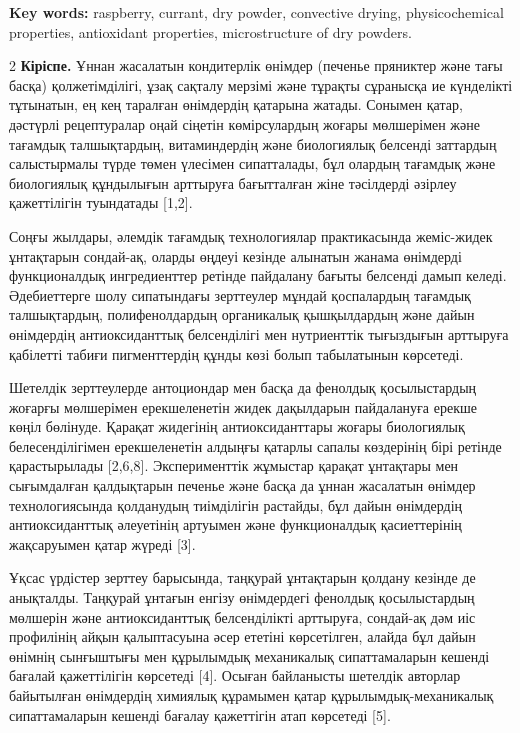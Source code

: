 {\bfseries Key words:} raspberry, currant, dry powder, convective drying,
physicochemical properties, antioxidant properties, microstructure of
dry powders.

\begin{multicols}{2}
{\bfseries Кіріспе.} Ұннан жасалатын кондитерлік өнімдер (печенье пряниктер
және тағы басқа) қолжетімділігі, ұзақ сақталу мерзімі және тұрақты
сұранысқа ие күнделікті тұтынатын, ең кең таралған өнімдердің қатарына
жатады. Сонымен қатар, дәстүрлі рецептуралар оңай сіңетін көмірсулардың
жоғары мөлшерімен және тағамдық талшықтардың, витаминдердің және
биологиялық белсенді заттардың салыстырмалы түрде төмен үлесімен
сипатталады, бұл олардың тағамдық және биологиялық құндылығын арттыруға
бағытталған жіне тәсілдерді әзірлеу қажеттілігін туындатады {[}1,2{]}.

Соңғы жылдары, әлемдік тағамдық технологиялар практикасында жеміс-жидек
ұнтақтарын сондай-ақ, оларды өңдеуі кезінде алынатын жанама өнімдерді
функционалдық ингредиенттер ретінде пайдалану бағыты белсенді дамып
келеді. Әдебиеттерге шолу сипатындағы зерттеулер мұндай қоспалардың
тағамдық талшықтардың, полифенолдардың органикалық қышқылдардың және
дайын өнімдердің антиоксиданттық белсенділігі мен нутриенттік тығыздығын
арттыруға қабілетті табиғи пигменттердің құнды көзі болып табылатынын
көрсетеді.

Шетелдік зерттеулерде антоциондар мен басқа да фенолдық қосылыстардың
жоғарғы мөлшерімен ерекшеленетін жидек дақылдарын пайдалануға ерекше
көңіл бөлінуде. Қарақат жидегінің антиоксиданттары жоғары биологиялық
белесенділігімен ерекшеленетін алдыңғы қатарлы сапалы көздерінің бірі
ретінде қарастырылады {[}2,6,8{]}. Эксперименттік жұмыстар қарақат
ұнтақтары мен сығымдалған қалдықтарын печенье және басқа да ұннан
жасалатын өнімдер технологиясында қолданудың тиімділігін растайды, бұл
дайын өнімдердің антиоксиданттық әлеуетінің артуымен және функционалдық
қасиеттерінің жақсаруымен қатар жүреді {[}3{]}.

Ұқсас үрдістер зерттеу барысында, таңқурай ұнтақтарын қолдану кезінде де
анықталды. Таңқурай ұнтағын енгізу өнімдердегі фенолдық қосылыстардың
мөлшерін және антиоксиданттық белсенділікті арттыруға, сондай-ақ дәм иіс
профилінің айқын қалыптасуына әсер ететіні көрсетілген, алайда бұл дайын
өнімнің сынғыштығы мен құрылымдық механикалық сипаттамаларын кешенді
бағалай қажеттілігін көрсетеді {[}4{]}. Осыған байланысты шетелдік
авторлар байытылған өнімдердің химиялық құрамымен қатар
құрылымдық-механикалық сипаттамаларын кешенді бағалау қажеттігін атап
көрсетеді {[}5{]}.


\end{multicols}
